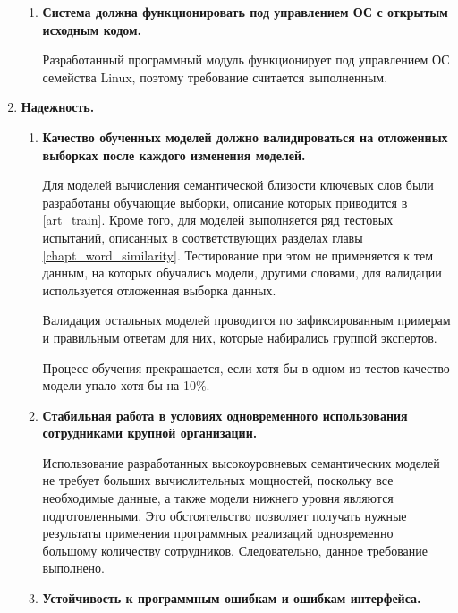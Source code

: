 \begin{enumerate}
\begin{enumerate}[label*=\arabic*.]


        \item \textbf{Система должна функционировать под управлением ОС с открытым исходным кодом.}

            Разработанный программный модуль функционирует под управлением ОС семейства Linux, поэтому требование считается выполненным.
    \end{enumerate}

    \item \textbf{Надежность.}
    \begin{enumerate}[label*=\arabic*.]
        \item  \textbf{Качество обученных моделей должно валидироваться на отложенных выборках после каждого изменения моделей.}

            Для моделей вычисления семантической близости ключевых слов были разработаны обучающие выборки, описание которых приводится в \ref{art_train}. Кроме того, для моделей выполняется ряд тестовых испытаний, описанных в соответствующих разделах главы \ref{chapt_word_similarity}. Тестирование при этом не применяется к тем данным, на которых обучались модели, другими словами, для валидации используется отложенная выборка данных. 
            
            Валидация остальных моделей проводится по зафиксированным примерам и правильным ответам для них, которые набирались группой экспертов.

            Процесс обучения прекращается, если хотя бы в одном из тестов качество модели упало хотя бы на 10\%. 

        \item  \textbf{Стабильная работа в условиях одновременного использования сотрудниками крупной организации.}

             Использование разработанных высокоуровневых семантических моделей не требует больших вычислительных мощностей, поскольку все необходимые данные, а также модели нижнего уровня являются подготовленными. Это обстоятельство позволяет получать нужные результаты применения программных реализаций одновременно большому количеству сотрудников. Следовательно, данное требование выполнено.

        \item  \textbf{Устойчивость к программным ошибкам и ошибкам интерфейса.}


\end{enumerate}
\end{enumerate}
